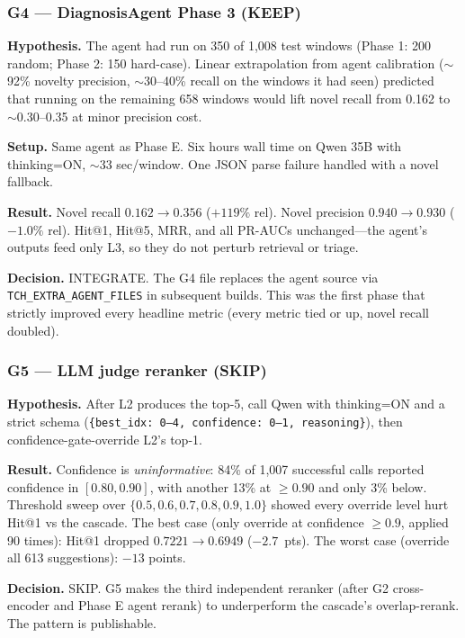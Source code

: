 \subsubsection{G4 --- DiagnosisAgent Phase 3 (KEEP)}

\textbf{Hypothesis.} The agent had run on 350 of 1{,}008 test windows (Phase 1: 200 random; Phase 2: 150 hard-case). Linear extrapolation from agent calibration ($\sim$92\% novelty precision, $\sim$30--40\% recall on the windows it had seen) predicted that running on the remaining 658 windows would lift novel recall from 0.162 to $\sim$0.30--0.35 at minor precision cost.

\textbf{Setup.} Same agent as Phase E. Six hours wall time on Qwen 35B with thinking=ON, $\sim$33 sec/window. One JSON parse failure handled with a novel fallback.

\textbf{Result.} Novel recall $0.162 \to 0.356$ ($+119\%$ rel). Novel precision $0.940 \to 0.930$ ($-1.0\%$ rel). Hit@1, Hit@5, MRR, and all PR-AUCs unchanged---the agent's outputs feed only L3, so they do not perturb retrieval or triage.

\textbf{Decision.} INTEGRATE. The G4 file replaces the agent source via \texttt{TCH\_EXTRA\_AGENT\_FILES} in subsequent builds. This was the first phase that strictly improved every headline metric (every metric tied or up, novel recall doubled).

\subsubsection{G5 --- LLM judge reranker (SKIP)}

\textbf{Hypothesis.} After L2 produces the top-5, call Qwen with thinking=ON and a strict schema (\texttt{\{best\_idx: 0--4, confidence: 0--1, reasoning\}}), then confidence-gate-override L2's top-1.

\textbf{Result.} Confidence is \emph{uninformative}: 84\% of 1{,}007 successful calls reported confidence in $[0.80, 0.90]$, with another 13\% at $\geq 0.90$ and only 3\% below. Threshold sweep over $\{0.5, 0.6, 0.7, 0.8, 0.9, 1.0\}$ showed every override level hurt Hit@1 vs the cascade. The best case (only override at confidence $\geq 0.9$, applied 90 times): Hit@1 dropped $0.7221 \to 0.6949$ ($-2.7$~pts). The worst case (override all 613 suggestions): $-13$ points.

\textbf{Decision.} SKIP. G5 makes the third independent reranker (after G2 cross-encoder and Phase E agent rerank) to underperform the cascade's overlap-rerank. The pattern is publishable.

